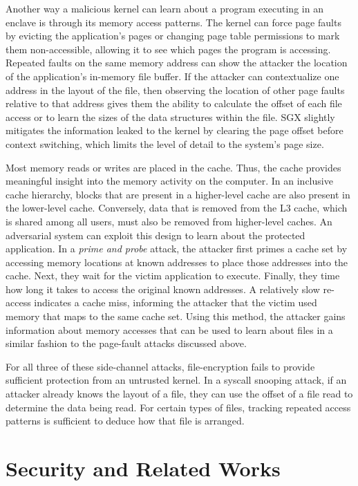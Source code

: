 \documentclass[letterpaper,twocolumn,10pt]{article}
\begin{document}


Another way a malicious kernel can learn about a program executing in an
enclave is through its memory access patterns.  The kernel can force page
faults by evicting the application's pages or changing page table permissions
to mark them non-accessible, allowing it to see which pages the program is
accessing.  Repeated faults on the same memory address can show the attacker
the location of the application's in-memory file buffer.  If the attacker can
contextualize one address in the layout of the file, then observing the
location of other page faults relative to that address gives them the ability
to calculate the offset of each file access or to learn the sizes of the data
structures within the file. SGX slightly mitigates the information leaked to
the kernel by clearing the page offset before context switching, which limits
the level of detail to the system's page size.

Most memory reads or writes are placed in the cache. Thus, the cache provides
meaningful insight into the memory activity on the computer.  In an inclusive
cache hierarchy, blocks that are present in a higher-level cache are also
present in the lower-level cache. Conversely, data that is removed from the L3
cache, which is shared among all users, must also be removed from higher-level
caches. An adversarial system can exploit this design to learn about the
protected application. In a \emph{prime and probe} attack, the attacker first
primes a cache set by accessing memory locations at known addresses to place
those addresses into the cache. Next, they wait for the victim application to
execute. Finally, they time how long it takes to access the original known
addresses. A relatively slow re-access indicates a cache miss, informing the
attacker that the victim used memory that maps to the same cache set. Using
this method, the attacker gains information about memory accesses that can be
used to learn about files in a similar fashion to the page-fault attacks
discussed above.

For all three of these side-channel attacks, file-encryption fails to provide
sufficient protection from an untrusted kernel.  In a syscall snooping attack,
if an attacker already knows the layout of a file, they can use the offset of a
file read to determine the data being read.  For certain types of files,
tracking repeated access patterns is sufficient to deduce how that file is
arranged.


\section{Security and Related Works}
\end{document}
